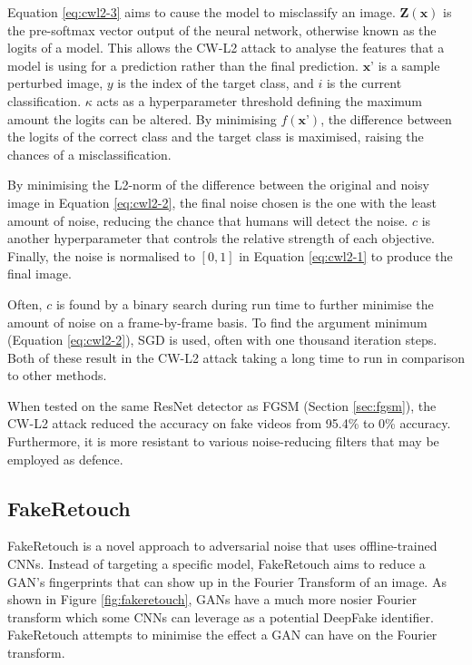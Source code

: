 Equation \ref{eq:cwl2-3} aims to cause the model to misclassify an image. $\mathbf{Z}(\textbf{x})$ is the pre-softmax vector output of the neural network, otherwise known as the logits of a model. This allows the CW-L2 attack to analyse the features that a model is using for a prediction rather than the final prediction. $\textbf{x'}$ is a sample perturbed image, $y$ is the index of the target class, and $i$ is the current classification. $\kappa$ acts as a hyperparameter threshold defining the maximum amount the logits can be altered. By minimising $f(\textbf{x'})$, the difference between the logits of the correct class and the target class is maximised, raising the chances of a misclassification.

By minimising the L2-norm of the difference between the original and noisy image in Equation \ref{eq:cwl2-2}, the final noise chosen is the one with the least amount of noise, reducing the chance that humans will detect the noise. $c$ is another hyperparameter that controls the relative strength of each objective. Finally, the noise is normalised to $[0,1]$ in Equation \ref{eq:cwl2-1} to produce the final image.

Often, $c$ is found by a binary search during run time to further minimise the amount of noise on a frame-by-frame basis. To find the argument minimum (Equation \ref{eq:cwl2-2}), SGD\cite{robbins1951stochastic} is used, often with one thousand iteration steps. Both of these result in the CW-L2 attack taking a long time to run in comparison to other methods.

When tested on the same ResNet detector as FGSM (Section \ref{sec:fgsm}), the CW-L2 attack reduced the accuracy on fake videos from 95.4\% to 0\% accuracy. Furthermore, it is more resistant to various noise-reducing filters that may be employed as defence\cite{gandhi2020adversarial}.

\subsection{FakeRetouch}

FakeRetouch\cite{huang2020fakeretouch} is a novel approach to adversarial noise that uses offline-trained CNNs. Instead of targeting a specific model, FakeRetouch aims to reduce a GAN's fingerprints that can show up in the Fourier Transform of an image. As shown in Figure \ref{fig:fakeretouch}, GANs have a much more nosier Fourier transform which some CNNs can leverage as a potential DeepFake identifier. FakeRetouch attempts to minimise the effect a GAN can have on the Fourier transform.

